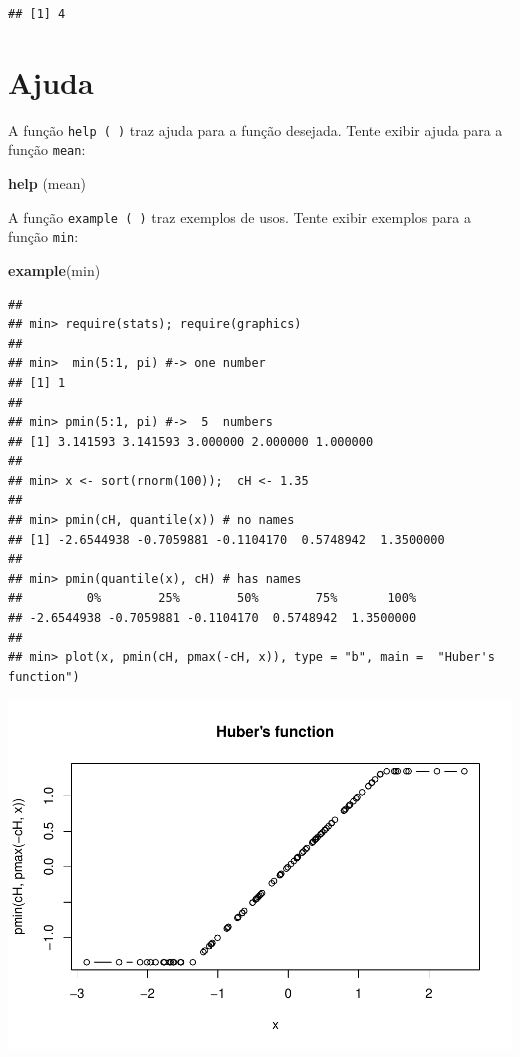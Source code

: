 \documentclass[]{book}
\newenvironment{Shaded}{\begin{snugshade}}{\end{snugshade}}
\newcommand{\KeywordTok}[1]{\textcolor[rgb]{0.13,0.29,0.53}{\textbf{#1}}}
\newcommand{\NormalTok}[1]{#1}
\begin{document}
\begin{verbatim}
## [1] 4
\end{verbatim}

\hypertarget{ajuda}{%
\section{Ajuda}\label{ajuda}}

A função \texttt{help\ (\ )} traz ajuda para a função desejada. Tente exibir ajuda para a função \texttt{mean}:

\begin{Shaded}
\begin{Highlighting}[]
\KeywordTok{help}\NormalTok{ (mean)}
\end{Highlighting}
\end{Shaded}

A função \texttt{example\ (\ )} traz exemplos de usos. Tente exibir exemplos para a função \texttt{min}:

\begin{Shaded}
\begin{Highlighting}[]
\KeywordTok{example}\NormalTok{(min)}
\end{Highlighting}
\end{Shaded}

\begin{verbatim}
## 
## min> require(stats); require(graphics)
## 
## min>  min(5:1, pi) #-> one number
## [1] 1
## 
## min> pmin(5:1, pi) #->  5  numbers
## [1] 3.141593 3.141593 3.000000 2.000000 1.000000
## 
## min> x <- sort(rnorm(100));  cH <- 1.35
## 
## min> pmin(cH, quantile(x)) # no names
## [1] -2.6544938 -0.7059881 -0.1104170  0.5748942  1.3500000
## 
## min> pmin(quantile(x), cH) # has names
##         0%        25%        50%        75%       100% 
## -2.6544938 -0.7059881 -0.1104170  0.5748942  1.3500000 
## 
## min> plot(x, pmin(cH, pmax(-cH, x)), type = "b", main =  "Huber's function")
\end{verbatim}

\includegraphics{TudodoR_files/figure-latex/unnamed-chunk-14-1.pdf}
\end{document}
